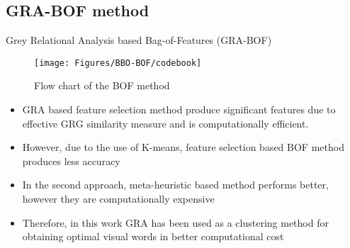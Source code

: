 \documentclass [9pt,times] {beamer}
\begin{document}
\subsection{GRA-BOF method}
\begin{frame}{Grey Relational Analysis based Bag-of-Features (GRA-BOF)}
\begin{figure}[t]
			\centering
			\texttt{[image: Figures/BBO-BOF/codebook]}
			\caption{{\scriptsize Flow chart of the BOF method}}\label{fig:emp}
\end{figure}
\begin{itemize}
\justifying
\item  GRA based feature selection method produce significant features due to effective GRG similarity measure and is computationally efficient.\\[2ex]

\item However, due to the use of K-means, feature selection based BOF method produces less accuracy \\[2ex]

\item In the second approach, meta-heuristic based method performs better, however they are computationally expensive\\[2ex]

\item Therefore, in this work GRA has been used as a clustering method for obtaining optimal visual words in better computational cost
\end{itemize}
\end{frame}
\end{document}
